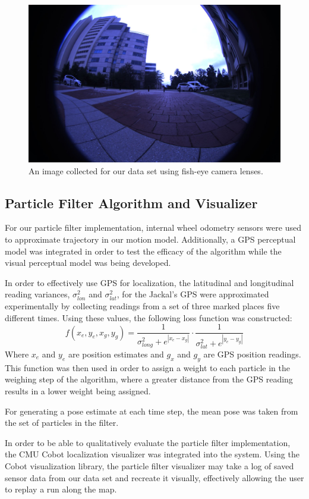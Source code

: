 \documentclass[letterpaper, 12 pt, conference]{ieeeconf}  %
\begin{document}
\begin{figure}[h]
\centering
\includegraphics[scale=0.21]{Fisheye}
\caption{An image collected for our data set using fish-eye camera lenses.}
\end{figure}

\subsection{Particle Filter Algorithm and Visualizer}
For our particle filter implementation, internal wheel odometry sensors were used to approximate trajectory in our motion model. Additionally, a GPS perceptual model was integrated in order to test the efficacy of the algorithm while the visual perceptual model was being developed. 
\par
In order to effectively use GPS for localization, the latitudinal and longitudinal reading variances, $\sigma _{lon}^2$ and $\sigma _{lat}^2$, for the Jackal's GPS were approximated experimentally by collecting readings from a set of three marked places five different times. Using these values, the following loss function was constructed:
$$
f(x_e,y_e,x_g,y_g)= \frac{1}{\sigma _{long}^2 + e^{|x_e-x_g|}}\cdot \frac{1}{\sigma _{lat}^2 + e^{|y_e-y_g|}}
$$
Where $x_e$ and $y_e$ are position estimates and $g_x$ and $g_y$ are GPS position readings. This function was then used in order to assign a weight to each particle in the weighing step of the algorithm, where a greater distance from the GPS reading results in a lower weight being assigned.
\par
For generating a pose estimate at each time step, the mean pose was taken from the set of particles in the filter. 
\par
In order to be able to qualitatively evaluate the particle filter implementation, the CMU Cobot \cite{cobot} localization visualizer was integrated into the system. Using the Cobot visualization library, the particle filter visualizer may take a log of saved sensor data from our data set and recreate it visually, effectively allowing the user to replay a run along the map. 
\end{document}
